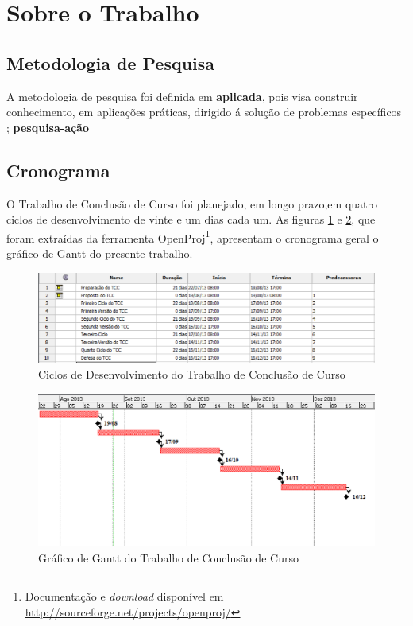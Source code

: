 
\section{Sobre o Trabalho}
\subsection {Metodologia de Pesquisa}
A metodologia de pesquisa foi definida em \textbf{aplicada}, pois visa construir 
conhecimento, em aplicações práticas, dirigido á solução de problemas 
específicos \cite{Gil2008}; \textbf{pesquisa-ação}



\subsection{Cronograma}
O Trabalho de Conclusão de Curso foi planejado, em longo prazo,em quatro ciclos 
de desenvolvimento de vinte e um dias cada um. 
As figuras \ref{cronograma} e \ref{gantt}, que foram extraídas da ferramenta 
OpenProj\footnote{Documentação e \textit{download} disponível em 
\url{http://sourceforge.net/projects/openproj/}}, 
apresentam o cronograma geral o gráfico de Gantt do presente trabalho.

\begin{figure}[h]
\centering
	\includegraphics[keepaspectratio=true,scale=0.7]{figuras/marcos.eps}
	\caption{Ciclos de Desenvolvimento do Trabalho de Conclusão de Curso}
	\label{cronograma}
\end{figure}

\clearpage

\begin{figure}[h]
\centering
	\includegraphics[keepaspectratio=true,scale=0.7]{figuras/gantt_chart.eps}
	\caption{Gráfico de Gantt do Trabalho de Conclusão de Curso}
	\label{gantt}
\end{figure}


